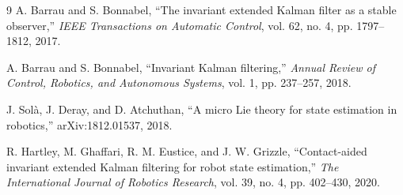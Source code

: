 \documentclass[conference]{IEEEtran}
\theoremstyle{bodysmall}
\begin{document}
\begin{thebibliography}{9}
A. Barrau and S. Bonnabel, ``The invariant extended Kalman filter as a stable observer,'' \emph{IEEE Transactions on Automatic Control}, vol. 62, no. 4, pp. 1797--1812, 2017.

A. Barrau and S. Bonnabel, ``Invariant Kalman filtering,'' \emph{Annual Review of Control, Robotics, and Autonomous Systems}, vol. 1, pp. 237--257, 2018.

J. Sol\`a, J. Deray, and D. Atchuthan, ``A micro Lie theory for state estimation in robotics,'' arXiv:1812.01537, 2018.

R. Hartley, M. Ghaffari, R. M. Eustice, and J. W. Grizzle, ``Contact-aided invariant extended Kalman filtering for robot state estimation,'' \emph{The International Journal of Robotics Research}, vol. 39, no. 4, pp. 402--430, 2020.
\end{thebibliography}

\balance
\end{document}
